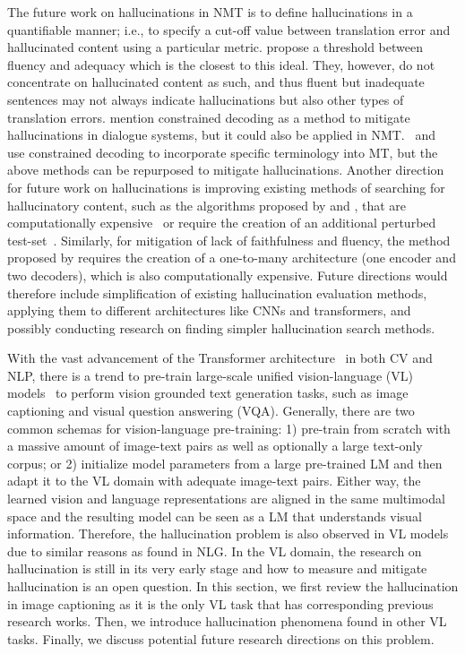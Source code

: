 The future work on hallucinations in NMT is to define hallucinations in a quantifiable manner; i.e., to specify a cut-off value between translation error and hallucinated content using a particular metric. 
 propose a threshold between fluency and adequacy which is the closest to this ideal. They, however, do not concentrate on hallucinated content as such, and thus fluent but inadequate sentences may not always indicate hallucinations but also other types of translation errors.
 mention constrained decoding as a method to mitigate hallucinations in dialogue systems, but it could also be applied in NMT.~ and~ use constrained decoding to incorporate specific terminology into MT, but the above methods can be repurposed to mitigate hallucinations. 
Another direction for future work on hallucinations is improving existing methods of searching for hallucinatory content, such as the algorithms proposed by  and , that are computationally expensive~ or require the creation of an additional perturbed test-set~. 
Similarly, for mitigation of lack of faithfulness and fluency, the method proposed by  requires the creation of a one-to-many architecture (one encoder and two decoders), which is also computationally expensive. 
Future directions would therefore include simplification of existing hallucination evaluation methods, applying them to different architectures like CNNs and transformers, and possibly conducting research on finding simpler hallucination search methods.

\label{section:VL}
With the vast advancement of the Transformer architecture~ in both CV and NLP, there is a trend to pre-train large-scale unified vision-language (VL) models~ to perform vision grounded text generation tasks, such as image captioning and visual question answering (VQA). Generally, there are two common schemas for vision-language pre-training: 1) pre-train from scratch with a massive amount of image-text pairs as well as optionally a large text-only corpus; or 2) initialize model parameters from a large pre-trained LM and then adapt it to the VL domain with adequate image-text pairs. Either way, the learned vision and language representations are aligned in the same multimodal space and the resulting model can be seen as a LM that understands visual information. Therefore, the hallucination problem is also observed in VL models due to similar reasons as found in NLG. 
In the VL domain, the research on hallucination is still in its very early stage and how to measure and mitigate hallucination is an open question. In this section, we first review the hallucination in image captioning as it is the only VL task that has corresponding previous research works. Then, we introduce hallucination phenomena found in other VL tasks. Finally, we discuss potential future research directions on this problem.



